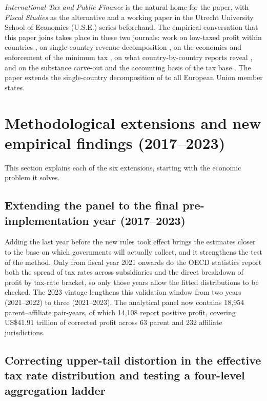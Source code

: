 \documentclass[11pt,a4paper]{article}
\newcommand{\usd}{US\$}
\begin{document}
\emph{International Tax and Public Finance} is the natural home for the paper, with \emph{Fiscal Studies} as the alternative and a working paper in the Utrecht University School of Economics (U.S.E.) series beforehand. The empirical conversation that this paper joins takes place in these two journals: work on low-taxed profit within countries \citep{hugger2026}, on single-country revenue decomposition \citep{boukal2026}, on the economics and enforcement of the minimum tax \citep{schjelderup2024,hindriks2026}, on what country-by-country reports reveal \citep{godar2024,tuinsma2025}, and on the substance carve-out and the accounting basis of the tax base \citep{devereux2023,hanlon2023}. The paper extends the single-country decomposition of \citet{boukal2026} to all European Union member states.

\section[Methodological extensions and new findings]{Methodological extensions and new empirical findings (2017–2023)}

This section explains each of the six extensions, starting with the economic problem it solves.

\subsection{Extending the panel to the final pre-implementation year (2017–2023)}

Adding the last year before the new rules took effect brings the estimates closer to the base on which governments will actually collect, and it strengthens the test of the method. Only from fiscal year 2021 onwards do the OECD statistics report both the spread of tax rates across subsidiaries and the direct breakdown of profit by tax-rate bracket, so only those years allow the fitted distributions to be checked. The 2023 vintage lengthens this validation window from two years (2021–2022) to three (2021–2023). The analytical panel now contains 18,954 parent–affiliate pair-years, of which 14,108 report positive profit, covering \usd41.91 trillion of corrected profit across 63 parent and 232 affiliate jurisdictions.

\subsection{Correcting upper-tail distortion in the effective tax rate distribution and testing a four-level aggregation ladder}
\end{document}
